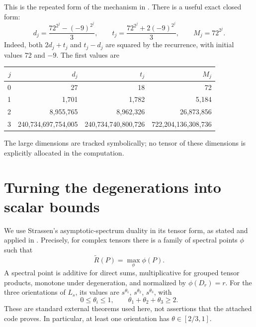 \documentclass[11pt]{article}
\newcommand{\AR}{\widetilde{R}}
\theoremstyle{definition}\newtheorem{definition}[theorem]{Definition}
\theoremstyle{remark}\newtheorem{remark}[theorem]{Remark}
\begin{document}
This is the repeated form of the mechanism in \cite[Theorem 6.2]{alman}.
There is a useful exact closed form:
\begin{equation}\label{eq:closed}
d_j=\frac{72^{2^j}-(-9)^{2^j}}3,\qquad
t_j=\frac{72^{2^j}+2(-9)^{2^j}}3,\qquad M_j=72^{2^j}.
\end{equation}
Indeed, both $2d_j+t_j$ and $t_j-d_j$ are squared by the recurrence, with initial
values 72 and $-9$. The first values are
\begin{center}\small
\begin{tabular}{rrrr}
\toprule
$j$&$d_j$&$t_j$&$M_j$\\\midrule
0&27&18&72\\
1&1,701&1,782&5,184\\
2&8,955,765&8,962,326&26,873,856\\
3&240,734,697,754,005&240,734,740,800,726&722,204,136,308,736\\
\bottomrule
\end{tabular}
\end{center}
The large dimensions are tracked symbolically; no tensor of these dimensions
is explicitly allocated in the computation.

\section{Turning the degenerations into scalar bounds}\label{sec:spectral}
We use Strassen's asymptotic-spectrum duality in its tensor form, as stated and
applied in \cite[Section 4]{alman}. Precisely, for complex tensors there is a
family of spectral points $\phi$ such that
\[
\AR(P)=\max_\phi\phi(P).
\]
A spectral point is additive for direct sums, multiplicative for grouped tensor
products, monotone under degeneration, and normalized by $\phi(D_r)=r$.
For the three orientations of $L_s$, its values are $s^{\theta_1}$,
$s^{\theta_2}$, $s^{\theta_3}$, with
\begin{equation}\label{eq:theta}
0\leq\theta_i\leq1,\qquad\theta_1+\theta_2+\theta_3\geq2.
\end{equation}
These are standard external theorems used here, not assertions that the
attached code proves. In particular, at least one orientation has
$\theta\in[2/3,1]$.
\end{document}
